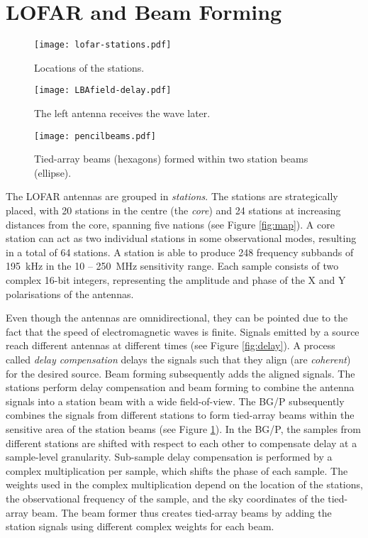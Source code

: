 \documentclass{llncs}
\begin{document}
\section{LOFAR and Beam Forming}
\label{Sec:LOFAR}

\begin{figure}[t]
\begin{minipage}[b]{40mm}
   \texttt{[image: lofar-stations.pdf]}
   \caption{Locations of the stations.}
   \label{fig:map}
\end{minipage}
\hfill
\begin{minipage}[b]{35mm}
   \texttt{[image: LBAfield-delay.pdf]}
   \caption{The left antenna receives the wave later.}
   \label{fig:delay}
\end{minipage}
\hfill
\begin{minipage}[b]{40mm}
  \texttt{[image: pencilbeams.pdf]}
  \caption{Tied-array beams (hexagons) formed within two station beams (ellipse).}
  \label{fig:pencilbeams}
\end{minipage}
\end{figure}

The LOFAR antennas are grouped in \emph{stations}. The stations are strategically placed, with 20 stations in the centre (the \emph{core}) and 24 stations at increasing distances from the core, spanning five nations (see Figure \ref{fig:map}). A core station can act as two individual stations in some observational modes, resulting in a total of 64 stations. A station is able to produce 248 frequency subbands of 195~kHz in the 10 -- 250~MHz sensitivity range. Each sample consists of two complex 16-bit integers, representing the amplitude and phase of the X and Y polarisations of the antennas.

Even though the antennas are omnidirectional, they can be pointed due to the fact that the speed of electromagnetic waves is finite. Signals emitted by a source reach different antennas at different times (see Figure \ref{fig:delay}). A process called \emph{delay compensation} delays the signals such that they align (are \emph{coherent}) for the desired source. Beam forming subsequently adds the aligned signals. The stations perform delay compensation and beam forming to combine the antenna signals into a station beam with a wide field-of-view. The BG/P subsequently combines the signals from different stations to form tied-array beams within the sensitive area of the station beams (see Figure \ref{fig:pencilbeams}). In the BG/P, the samples from different stations are shifted with respect to each other to compensate delay at a sample-level granularity. Sub-sample delay compensation is performed by a complex multiplication per sample, which shifts the phase of each sample. The weights used in the complex multiplication depend on the location of the stations, the observational frequency of the sample, and the sky coordinates of the tied-array beam. The beam former thus creates tied-array beams by adding the station signals using different complex weights for each beam.
\end{document}
